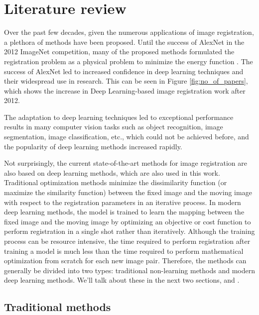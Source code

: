 \documentclass{report}
\begin{document}
	\chapter{Literature review}
	\label{chap:litreture}
	Over the past few decades, given the numerous applications of image registration, a plethora of methods have been proposed. Until the success of AlexNet \cite{AlexNet} in the 2012 ImageNet competition, many of the proposed methods formulated the registration problem as a physical problem to minimize the energy function \cite{THIRION1998243} \cite{536892} \cite{5193151} \cite{5338015} \cite{Avants2011ARE} \cite{1009381}. The success of AlexNet led to increased confidence in deep learning techniques and their widespread use in research. This can be seen in Figure \ref{fig:no_of_papers}, which shows the increase in Deep Learning-based image registration work after 2012.
	
	The adaptation to deep learning techniques led to exceptional performance results in many computer vision tasks such as object recognition, image segmentation, image classification, etc., which could not be achieved before, and the popularity of deep learning methods increased rapidly.
	
	Not surprisingly, the current state-of-the-art methods for image registration are also based on deep learning methods, which are also used in this work. Traditional optimization methods minimize the dissimilarity function (or maximize the similarity function) between the fixed image and the moving image with respect to the registration parameters in an iterative process. In modern deep learning methods, the model is trained to learn the mapping between the fixed image and the moving image by optimizing an objective or cost function to perform registration in a single shot rather than iteratively. Although the training process can be resource intensive, the time required to perform registration after training a model is much less than the time required to perform mathematical optimization from scratch for each new image pair. Therefore, the methods can generally be divided into two types: traditional non-learning methods and modern deep learning methods. We'll talk about these in the next two sections,  and .
	
	\section{Traditional methods}
	\label{section:traditional}
	
\end{document}
